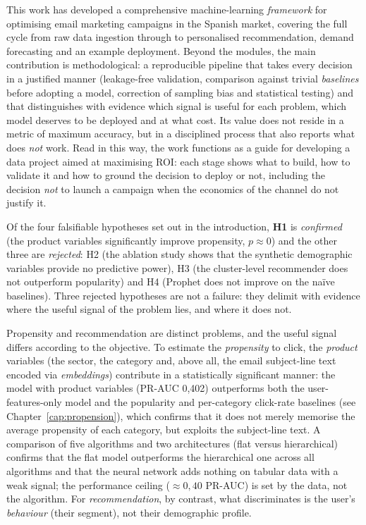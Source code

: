 This work has developed a comprehensive machine-learning \textit{framework} for optimising email marketing campaigns in the Spanish market, covering the full cycle from raw data ingestion through to personalised recommendation, demand forecasting and an example deployment. Beyond the modules, the main contribution is methodological: a reproducible pipeline that takes every decision in a justified manner (leakage-free validation, comparison against trivial \textit{baselines} before adopting a model, correction of sampling bias and statistical testing) and that distinguishes with evidence which signal is useful for each problem, which model deserves to be deployed and at what cost. Its value does not reside in a metric of maximum accuracy, but in a disciplined process that also reports what does \emph{not} work. Read in this way, the work functions as a guide for developing a data project aimed at maximising ROI: each stage shows what to build, how to validate it and how to ground the decision to deploy or not, including the decision \emph{not} to launch a campaign when the economics of the channel do not justify it.

Of the four falsifiable hypotheses set out in the introduction, \textbf{H1} is \emph{confirmed} (the product variables significantly improve propensity, $p\approx0$) and the other three are \emph{rejected}: H2 (the ablation study shows that the synthetic demographic variables provide no predictive power), H3 (the cluster-level recommender does not outperform popularity) and H4 (Prophet does not improve on the naïve baselines). Three rejected hypotheses are not a failure: they delimit with evidence where the useful signal of the problem lies, and where it does not.

Propensity and recommendation are distinct problems, and the useful signal differs according to the objective. To estimate the \emph{propensity} to click, the \emph{product} variables (the sector, the category and, above all, the email subject-line text encoded via \textit{embeddings}) contribute in a statistically significant manner: the model with product variables (PR-AUC 0,402) outperforms both the user-features-only model and the popularity and per-category click-rate baselines (see Chapter~\ref{cap:propension}), which confirms that it does not merely memorise the average propensity of each category, but exploits the subject-line text. A comparison of five algorithms and two architectures (flat versus hierarchical) confirms that the flat model outperforms the hierarchical one across all algorithms and that the neural network adds nothing on tabular data with a weak signal; the performance ceiling ($\approx0{,}40$ PR-AUC) is set by the data, not the algorithm. For \emph{recommendation}, by contrast, what discriminates is the user's \emph{behaviour} (their segment), not their demographic profile.

